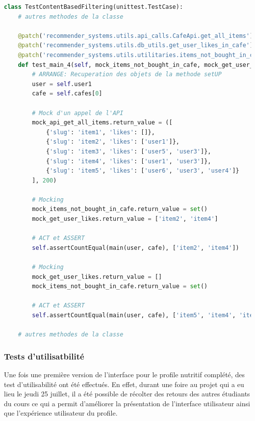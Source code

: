 \documentclass[11pt]{article}
\begin{document}
\begin{lstlisting}[language=Python, caption=Test unitaire test\_main\_4 content based filtering]
class TestContentBasedFiltering(unittest.TestCase):
    # autres methodes de la classe
    
    @patch('recommender_systems.utils.api_calls.CafeApi.get_all_items')
    @patch('recommender_systems.utils.db_utils.get_user_likes_in_cafe')
    @patch('recommender_systems.utils.utilitaries.items_not_bought_in_cafe')
    def test_main_4(self, mock_items_not_bought_in_cafe, mock_get_user_likes, mock_api_get_all_items):
        # ARRANGE: Recuperation des objets de la methode setUP
        user = self.user1
        cafe = self.cafes[0]

        # Mock d'un appel de l'API
        mock_api_get_all_items.return_value = ([
            {'slug': 'item1', 'likes': []}, 
            {'slug': 'item2', 'likes': ['user1']},
            {'slug': 'item3', 'likes': ['user5', 'user3']},
            {'slug': 'item4', 'likes': ['user1', 'user3']},
            {'slug': 'item5', 'likes': ['user6', 'user3', 'user4']}
        ], 200)

        # Mocking
        mock_items_not_bought_in_cafe.return_value = set()
        mock_get_user_likes.return_value = ['item2', 'item4']
        
        # ACT et ASSERT
        self.assertCountEqual(main(user, cafe), ['item2', 'item4'])

        # Mocking
        mock_get_user_likes.return_value = []
        mock_items_not_bought_in_cafe.return_value = set()

        # ACT et ASSERT
        self.assertCountEqual(main(user, cafe), ['item5', 'item4', 'item3', 'item2', 'item1'])

    # autres methodes de la classe
\end{lstlisting}

\subsubsection{Tests d'utilisatbilité}
Une fois une première version de l'interface pour le profile nutritif complété, des test d'utilisabilité ont été effectués. En effet, durant une foire au projet qui a eu lieu le jeudi 25 juillet, il a été possible de récolter des retours des autres étudiants du cours ce qui a permit d'améliorer la présentation de l'interface utilisateur ainsi que l'expérience utilisateur du profile.\\
\end{document}
